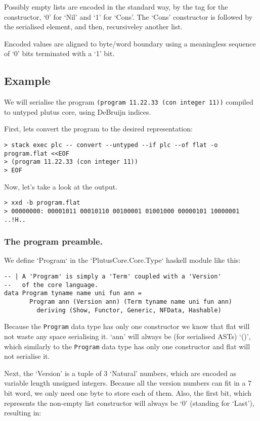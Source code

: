 \documentclass[a4paper]{article}
\begin{document}
\begin{appendices}
Possibly empty lists are encoded in the standard way, by the tag for the constructor,
`0' for `Nil' and `1' for `Cons'. The `Cons' constructor is followed by the serialised
element, and then, recursiveley another list.

Encoded values are aligned to byte/word boundary using a meaningless sequence of `0' bits
terminated with a `1' bit.

\subsection{Example}

We will serialise the program \verb|(program 11.22.33 (con integer 11))| compiled to untyped plutus core, using DeBruijn indices.

First, lets convert the program to the desired representation:

\begin{verbatim}
> stack exec plc -- convert --untyped --if plc --of flat -o program.flat <<EOF
> (program 11.22.33 (con integer 11))
> EOF
\end{verbatim}

Now, let's take a look at the output.

\begin{verbatim}
> xxd -b program.flat
> 00000000: 00001011 00010110 00100001 01001000 00000101 10000001  ..!H..
\end{verbatim}

\subsubsection{The program preamble.}

We define `Program` in the `PlutusCore.Core.Type` haskell module like this:

\begin{verbatim}
-- | A 'Program' is simply a 'Term' coupled with a 'Version' 
--   of the core language.
data Program tyname name uni fun ann = 
       Program ann (Version ann) (Term tyname name uni fun ann)
         deriving (Show, Functor, Generic, NFData, Hashable)
\end{verbatim}

Because the \verb|Program| data type has only one constructor we know that flat will not waste any space serialising it. `ann' will always be (for serialised ASTs) `()', which similarly to the \verb|Program| data type has only one constructor and flat will not serialise it.

Next, the `Version' is a tuple of 3 `Natural' numbers, which are encoded as variable length unsigned integers. Because all the version numbers can fit in a 7 bit word, we only need one byte to store each of them. Also, the first bit, which represents the non-empty list constructor will always be `0' (standing for `Last'), resulting in:


\end{appendices}
\end{document}
